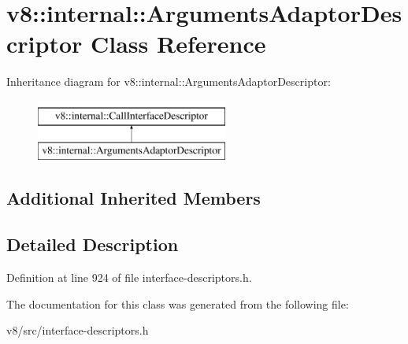 \hypertarget{classv8_1_1internal_1_1ArgumentsAdaptorDescriptor}{}\section{v8\+:\+:internal\+:\+:Arguments\+Adaptor\+Descriptor Class Reference}
\label{classv8_1_1internal_1_1ArgumentsAdaptorDescriptor}
Inheritance diagram for v8\+:\+:internal\+:\+:Arguments\+Adaptor\+Descriptor\+:\begin{figure}[H]
\begin{center}
\leavevmode
\includegraphics[height=2.000000cm]{classv8_1_1internal_1_1ArgumentsAdaptorDescriptor}
\end{center}
\end{figure}
\subsection*{Additional Inherited Members}


\subsection{Detailed Description}


Definition at line 924 of file interface-\/descriptors.\+h.



The documentation for this class was generated from the following file\+:\begin{DoxyCompactItemize}
\item 
v8/src/interface-\/descriptors.\+h\end{DoxyCompactItemize}
